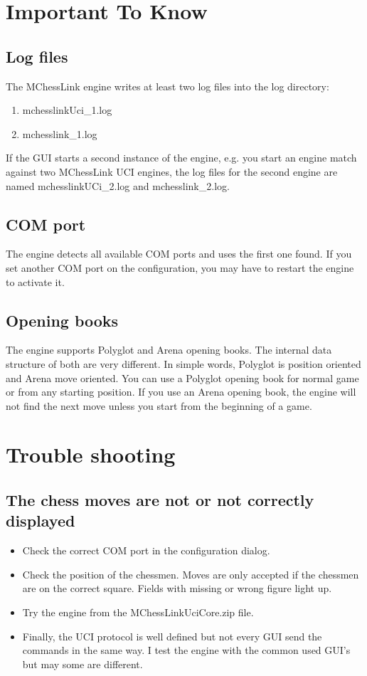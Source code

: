 \documentclass[11pt,a4paper]{article}
\begin{document}
\section{Important To Know}
\subsection{Log files}
The MChessLink engine writes at least two log files into the log directory:
\begin{enumerate}
  \item mchesslinkUci\_1.log
  \item mchesslink\_1.log
\end{enumerate}
If the GUI starts a second instance of the engine, e.g. you start an engine match against two MChessLink UCI engines, the log files for the second engine are named mchesslinkUCi\_2.log and mchesslink\_2.log.


\subsection{COM port}
The engine detects all available COM ports and uses the first one found. If you set another COM port on the configuration, you may have to restart the engine to activate it.

\subsection{Opening books}
The engine supports Polyglot and Arena opening books. The internal data structure of both are very different. In simple words, Polyglot is position oriented and Arena move oriented. You can use a Polyglot opening book for normal game or from any starting position. If you use an Arena opening book, the engine will not find the next move unless you start from the beginning of a game.

\section{Trouble shooting}


\subsection{The chess moves are not or not correctly displayed}
\begin{itemize}
	\item Check the correct COM port in the configuration dialog.
	\item Check the position of the chessmen. Moves are only accepted if the chessmen are on the correct square. Fields with missing or wrong figure light up.
	\item Try the engine from the MChessLinkUciCore.zip file.
	\item Finally, the UCI protocol is well defined but not every GUI send the commands in the same way. I test the engine with the common used GUI's but may some are different.
\end{itemize}
\end{document}
